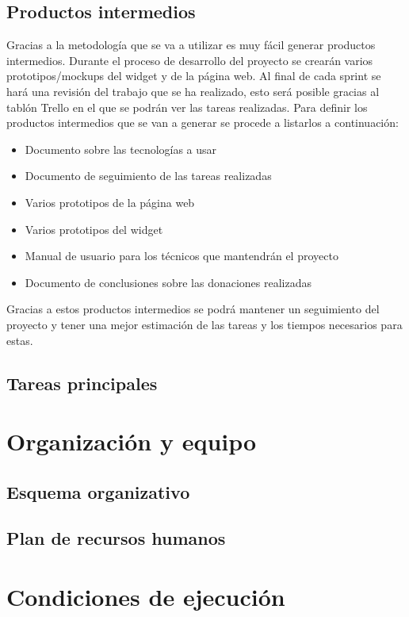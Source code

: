 \subsection{Productos intermedios}
Gracias a la metodología que se va a utilizar es muy fácil generar productos intermedios. Durante el proceso de desarrollo del proyecto se crearán varios prototipos/mockups del widget y de la página web. Al final de cada sprint se hará una revisión del trabajo que se ha realizado, esto será posible gracias al tablón Trello en el que se podrán ver las tareas realizadas. Para definir los productos intermedios que se van a generar se procede a listarlos a continuación:

\begin{itemize}
	\item Documento sobre las tecnologías a usar
	\item Documento de seguimiento de las tareas realizadas
	\item Varios prototipos de la página web
	\item Varios prototipos del widget
	\item Manual de usuario para los técnicos que mantendrán el proyecto
	\item Documento de conclusiones sobre las donaciones realizadas
\end{itemize}

Gracias a estos productos intermedios se podrá mantener un seguimiento del proyecto y tener una mejor estimación de las tareas y los tiempos necesarios para estas.


\subsection{Tareas principales}

\section{Organización y equipo}

\subsection{Esquema organizativo}

\subsection{Plan de recursos humanos}

\section{Condiciones de ejecución}

